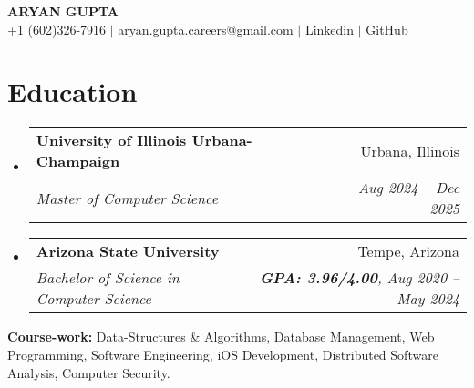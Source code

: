 \documentclass[letterpaper,11pt]{article}
\makeatletter
\newcommand{\resumeEducationHeading}[5]{
  \vspace{-2pt}\item
    \begin{tabular*}{0.97\textwidth}[t]{l@{\extracolsep{\fill}}r}
      \textbf{#1} & #2 \\
      \textit{\small#3} & \textit{\small #4#5} \\
    \end{tabular*}\vspace{-5pt}
}
\newcommand{\resumeSubHeadingListStart}{\begin{itemize}[leftmargin=0.15in, label={}]}
\newcommand{\resumeSubHeadingListEnd}{\end{itemize}}
\makeatother
\begin{document}
\begin{center}
  \textbf{\Huge \scshape ARYAN GUPTA} \\ \vspace{3pt} 
  \small
  \faMobile \hspace{.5pt} \href{tel:6023267916}{+1 (602)326-7916}
  $|$
  \faAt \hspace{.5pt} \href{mailto:aryan.gupta.careers@gmail.com}{aryan.gupta.careers@gmail.com}
  $|$
  \faLinkedinSquare \hspace{.5pt} \href{https://www.linkedin.com/in/agupt295}{{\color{blue}Linkedin}}
  $|$
  \faGithub \hspace{.5pt} \href{https://github.com/agupt295}{{\color{blue}GitHub}}
\end{center}

\section{\color[rgb]{0.25, 0.41, 0.88} Education}
\resumeSubHeadingListStart
  \resumeEducationHeading
    {University of Illinois Urbana-Champaign}{Urbana, Illinois}
    {Master of Computer Science}{Aug 2024 -- Dec 2025}{}{}
\resumeSubHeadingListEnd
\vspace{-0.35cm} %
\resumeSubHeadingListStart
  \resumeEducationHeading
    {Arizona State University}{Tempe, Arizona}
    {Bachelor of Science in Computer Science}{\textbf{GPA: 3.96/4.00}}{, Aug 2020 -- May 2024}{}
\resumeSubHeadingListEnd

  \resumeSubHeadingListStart
    \small{\item{
        \textbf{Course-work:}{ Data-Structures \& Algorithms, Database Management, Web Programming, Software Engineering, iOS Development, Distributed Software Analysis, Computer Security.} \\ \vspace{3pt}
    }}
  \resumeSubHeadingListEnd

\end{document}
